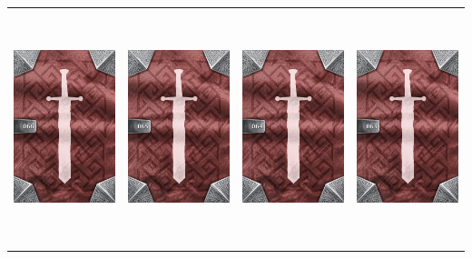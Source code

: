 \documentclass{minimal}
\begin{document}
{\begin{longtable}{llll}
\includegraphics[width=44mm,height=68mm]{./64-151/gh-066-mask-of-terror-back.png} &
\includegraphics[width=44mm,height=68mm]{./64-151/gh-065-platemail-back.png} &
\includegraphics[width=44mm,height=68mm]{./64-151/gh-064-boots-of-sprinting-back.png} &
\includegraphics[width=44mm,height=68mm]{./57-63/gh-063-lucky-eye-back.png}\\ 

\end{longtable}}
\end{document}
